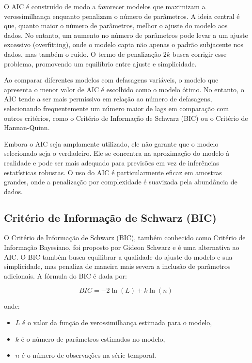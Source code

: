 \documentclass[12pt,oneside,a4paper,chapter=TITLE,english,brazil,sumario=abnt-6027-2012]{abntex2}
\begin{document}
O AIC é construído de modo a favorecer modelos que maximizam a verossimilhança enquanto penalizam o número de parâmetros. A ideia central é que, quanto maior o número de parâmetros, melhor o ajuste do modelo aos dados. No entanto, um aumento no número de parâmetros pode levar a um ajuste excessivo (overfitting), onde o modelo capta não apenas o padrão subjacente nos dados, mas também o ruído. O termo de penalização \( 2k \) busca corrigir esse problema, promovendo um equilíbrio entre ajuste e simplicidade.

Ao comparar diferentes modelos com defasagens variáveis, o modelo que apresenta o menor valor de AIC é escolhido como o modelo ótimo. No entanto, o AIC tende a ser mais permissivo em relação ao número de defasagens, selecionando frequentemente um número maior de lags em comparação com outros critérios, como o Critério de Informação de Schwarz (BIC) ou o Critério de Hannan-Quinn.

Embora o AIC seja amplamente utilizado, ele não garante que o modelo selecionado seja o verdadeiro. Ele se concentra na aproximação do modelo à realidade e pode ser mais adequado para previsões em vez de inferências estatísticas robustas. O uso do AIC é particularmente eficaz em amostras grandes, onde a penalização por complexidade é suavizada pela abundância de dados.

\subsection{Critério de Informação de Schwarz (BIC)}

O Critério de Informação de Schwarz (BIC), também conhecido como Critério de Informação Bayesiano, foi proposto por Gideon Schwarz e é uma alternativa ao AIC. O BIC também busca equilibrar a qualidade do ajuste do modelo e sua simplicidade, mas penaliza de maneira mais severa a inclusão de parâmetros adicionais. A fórmula do BIC é dada por:

\[
	BIC = -2 \ln(L) + k \ln(n)
\]

onde:

\begin{itemize}
	\item \( L \) é o valor da função de verossimilhança estimada para o modelo,
	\item \( k \) é o número de parâmetros estimados no modelo,
	\item \( n \) é o número de observações na série temporal.
\end{itemize}
\end{document}
